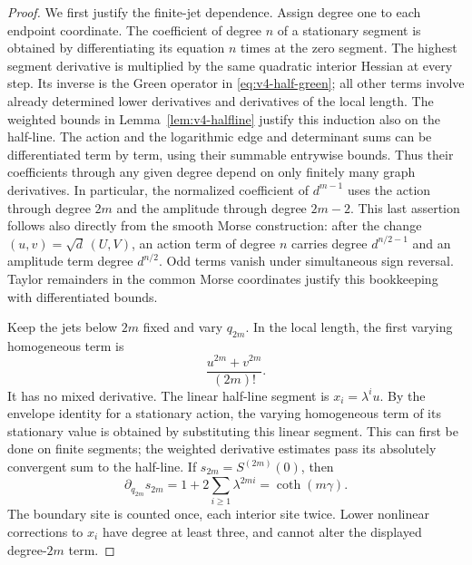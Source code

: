 \begin{proof}
We first justify the finite-jet dependence. Assign degree one to each
endpoint coordinate. The coefficient of degree $n$ of a stationary
segment is obtained by differentiating its equation $n$ times at the
zero segment. The highest segment derivative is multiplied by the same
quadratic interior Hessian at every step. Its inverse is the Green
operator in \eqref{eq:v4-half-green}; all other terms involve already
determined lower derivatives and derivatives of the local length.
The weighted bounds in Lemma~\ref{lem:v4-halfline} justify this
induction also on the half-line. The action and the logarithmic edge and
determinant sums can be differentiated term by term, using their
summable entrywise bounds. Thus their coefficients through any given
degree depend on only finitely many graph derivatives. In particular,
the normalized coefficient of $d^{m-1}$ uses the action through degree
$2m$ and the amplitude through degree $2m-2$. This last assertion follows
also directly from the smooth Morse construction: after the change
$(u,v)=\sqrt d\,(U,V)$, an action term of degree $n$ carries degree
$d^{n/2-1}$ and an amplitude term degree $d^{n/2}$. Odd terms vanish
under simultaneous sign reversal. Taylor remainders in the common
Morse coordinates justify this bookkeeping with differentiated bounds.

Keep the jets below $2m$ fixed and vary $q_{2m}$. In the local length,
the first varying homogeneous term is
\[
 \frac{u^{2m}+v^{2m}}{(2m)!}.
\]
It has no mixed derivative. The linear half-line segment is
$x_i=\lambda^i u$. By the envelope identity for a stationary action,
the varying homogeneous term of its stationary value is obtained by
substituting this linear segment. This can first be done on finite
segments; the weighted derivative estimates pass its absolutely
convergent sum to the half-line. If $s_{2m}=S^{(2m)}(0)$, then
\begin{equation}\label{eq:v5-action-diagonal}
 \partial_{q_{2m}}s_{2m}=1+2\sum_{i\ge1}\lambda^{2mi}
                            =\coth(m\gamma).
\end{equation}
The boundary site is counted once, each interior site twice. Lower
nonlinear corrections to $x_i$ have degree at least three, and cannot
alter the displayed degree-$2m$ term.


\end{proof}
